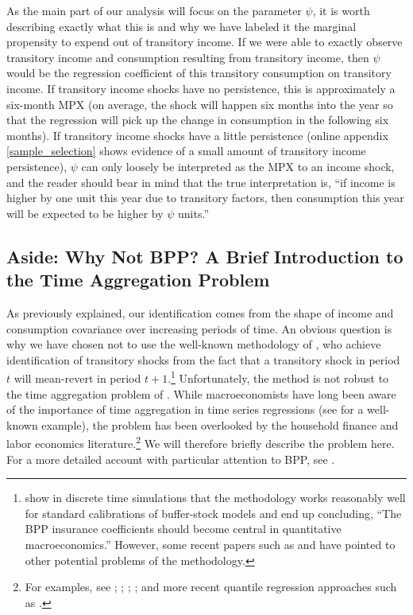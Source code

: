 \documentclass[titlepage]{\econtex}\newcommand{\texname}{ConsumptionHeterogeneity}
\begin{document}
As the main part of our analysis will focus on the parameter $\psi$, it is worth describing exactly what this is and why we have labeled it the marginal propensity to expend out of transitory income. If we were able to exactly observe transitory income and consumption resulting from transitory income, then $\psi$ would be the regression coefficient of this transitory consumption on transitory income. If transitory income shocks have no persistence, this is approximately a six-month MPX (on average, the shock will happen six months into the year so that the regression will pick up the change in consumption in the following six months). If transitory income shocks have a little persistence (online appendix \ref{sample_selection} shows evidence of a small amount of transitory income persistence), $\psi$ can only loosely be interpreted as the MPX to an income shock, and the reader should bear in mind that the true interpretation is, ``if income is higher by one unit this year due to transitory factors, then consumption this year will be expected to be higher by $\psi$ units.''

\subsection{Aside: Why Not BPP? A Brief Introduction to the Time Aggregation Problem} \label{TimeAgg}
As previously explained, our identification comes from the shape of income and consumption covariance over increasing periods of time. An obvious question is why we have chosen not to use the well-known methodology of \cite{blundell_consumption_2008}, who achieve identification of transitory shocks from the fact that a transitory shock in period $t$ will mean-revert in period $t+1$.\footnote{\cite{kaplan_how_2010} show in discrete time simulations that the methodology works reasonably well for standard calibrations of buffer-stock models and end up concluding, ``The BPP insurance coefficients should become central in quantitative macroeconomics.'' However, some recent papers such as \cite{commault_how_2017} and \cite{hryshko_income_2018} have pointed to other potential problems of the methodology.} Unfortunately, the method is not robust to the time aggregation problem of \cite{working_note_1960}. While macroeconomists have long been aware of the importance of time aggregation in time series regressions (see \cite{campbell_consumption_1989} for a well-known example), the problem has been overlooked by the household finance and labor economics literature.\footnote{For examples, see \cite{moffitt_trends_2012}; \cite{meghir_income_2004}; \cite{nielsen_impact_2004}; \cite{heathcote_unequal_2010}; and more recent quantile regression approaches such as \cite{arellano_earnings_2017}.} We will therefore briefly describe the problem here. For a more detailed account with particular attention to BPP, see \cite{crawley_time_2018}.
\end{document}
